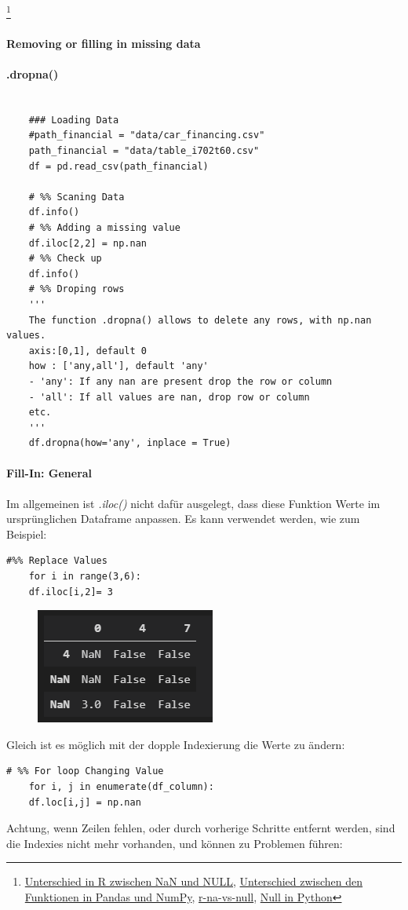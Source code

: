 \footnote{
	\href{https://www.r-bloggers.com/2010/04/r-na-vs-null/}{Unterschied in R zwischen NaN und NULL}, \href{https://datascience.stackexchange.com/questions/37878/difference-between-isna-and-isnull-in-pandas}{Unterschied zwischen den Funktionen in Pandas und NumPy}, 
	\href{https://www.r-bloggers.com/2010/04/r-na-vs-null/}{r-na-vs-null},
	\href{https://realpython.com/null-in-python/}{Null in Python}
}

\paragraph{Removing or filling in missing data}
\paragraph{.dropna()}
\begin{lstlisting}[style=Python]
	
	### Loading Data
	#path_financial = "data/car_financing.csv"
	path_financial = "data/table_i702t60.csv"
	df = pd.read_csv(path_financial)
	
	# %% Scaning Data
	df.info()
	# %% Adding a missing value
	df.iloc[2,2] = np.nan
	# %% Check up
	df.info()
	# %% Droping rows
	'''
	The function .dropna() allows to delete any rows, with np.nan values.
	axis:[0,1], default 0
	how : ['any,all'], default 'any'
	- 'any': If any nan are present drop the row or column
	- 'all': If all values are nan, drop row or column
	etc.
	'''
	df.dropna(how='any', inplace = True)
\end{lstlisting} 
\paragraph{Fill-In: General} Im allgemeinen ist \textit{.iloc()} nicht dafür ausgelegt, dass diese Funktion Werte im ursprünglichen Dataframe anpassen. Es kann verwendet werden, wie zum Beispiel:
\begin{lstlisting}[style=Python]
	#%% Replace Values
	for i in range(3,6):
	df.iloc[i,2]= 3
\end{lstlisting}
\begin{figure}[H]
	\centering
	\includegraphics[scale = 0.8]{attachment/chapter_4/Scc010}
\end{figure}
Gleich ist es möglich mit der dopple Indexierung die Werte zu ändern:
\begin{lstlisting}[style=Python]
	# %% For loop Changing Value
	for i, j in enumerate(df_column):
	df.loc[i,j] = np.nan
\end{lstlisting}
Achtung, wenn Zeilen fehlen, oder durch vorherige Schritte entfernt werden, sind die Indexies nicht mehr vorhanden, und können zu Problemen führen:
